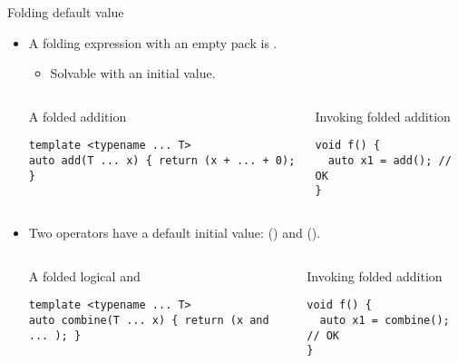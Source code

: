 \begin{frame}[t,fragile]{Folding default value}
\begin{itemize}
  \item A folding expression with an empty pack is .
    \begin{itemize}
      \item Solvable with an initial value.
    \end{itemize}

\begin{columns}[T]

\begin{block}{A folded addition}
\begin{lstlisting}
template <typename ... T>
auto add(T ... x) { return (x + ... + 0); }
\end{lstlisting}
\end{block}

\begin{block}{Invoking folded addition}
\begin{lstlisting}
void f() {
  auto x1 = add(); // OK
}
\end{lstlisting}
\end{block}

\end{columns}

  \item Two operators have a default initial value: \cppkey{\&\&} () and \cppkey{||} ().
\begin{columns}[T]

\begin{block}{A folded logical and}
\begin{lstlisting}
template <typename ... T>
auto combine(T ... x) { return (x and ... ); }
\end{lstlisting}
\end{block}

\begin{block}{Invoking folded addition}
\begin{lstlisting}
void f() {
  auto x1 = combine(); // OK
}
\end{lstlisting}
\end{block}

\end{columns}


\end{itemize}
\end{frame}

